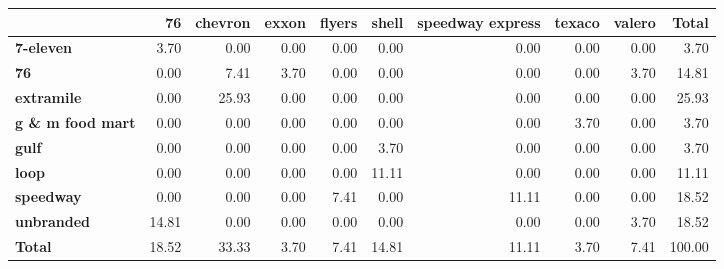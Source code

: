 \begin{tabular}{lrrrrrrrrr}
\toprule
 & \textbf{76} & \textbf{chevron} & \textbf{exxon} & \textbf{flyers} & \textbf{shell} & \textbf{speedway express} & \textbf{texaco} & \textbf{valero} & \textbf{Total} \\
\midrule
\textbf{7-eleven} & 3.70 & 0.00 & 0.00 & 0.00 & 0.00 & 0.00 & 0.00 & 0.00 & 3.70 \\
\textbf{76} & 0.00 & 7.41 & 3.70 & 0.00 & 0.00 & 0.00 & 0.00 & 3.70 & 14.81 \\
\textbf{extramile} & 0.00 & 25.93 & 0.00 & 0.00 & 0.00 & 0.00 & 0.00 & 0.00 & 25.93 \\
\textbf{g \& m food mart} & 0.00 & 0.00 & 0.00 & 0.00 & 0.00 & 0.00 & 3.70 & 0.00 & 3.70 \\
\textbf{gulf} & 0.00 & 0.00 & 0.00 & 0.00 & 3.70 & 0.00 & 0.00 & 0.00 & 3.70 \\
\textbf{loop} & 0.00 & 0.00 & 0.00 & 0.00 & 11.11 & 0.00 & 0.00 & 0.00 & 11.11 \\
\textbf{speedway} & 0.00 & 0.00 & 0.00 & 7.41 & 0.00 & 11.11 & 0.00 & 0.00 & 18.52 \\
\textbf{unbranded} & 14.81 & 0.00 & 0.00 & 0.00 & 0.00 & 0.00 & 0.00 & 3.70 & 18.52 \\
\textbf{Total} & 18.52 & 33.33 & 3.70 & 7.41 & 14.81 & 11.11 & 3.70 & 7.41 & 100.00 \\
\bottomrule
\end{tabular}
